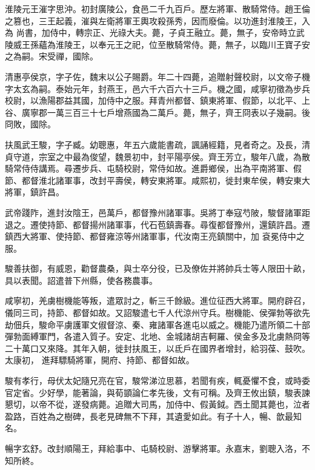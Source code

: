 \begin{pinyinscope}
 淮陵元王漼字思沖。初封廣陵公，食邑二千九百戶。歷左將軍、散騎常侍。趙王倫之篡也，三王起義，漼與左衛將軍王輿攻殺孫秀，因而廢倫。以功進封淮陵王，入為
 尚書，加侍中，轉宗正、光祿大夫。薨，子貞王融立。薨，無子，安帝時立武陵威王孫蘊為淮陵王，以奉元王之祀，位至散騎常侍。薨，無子，以臨川王寶子安之為嗣。宋受禪，國除。



 清惠亭侯京，字子佐，魏末以公子賜爵。年二十四薨，追贈射聲校尉，以文帝子機字太玄為嗣。泰始元年，封燕王，邑六千六百六十三戶。機之國，咸寧初徵為步兵校尉，以漁陽郡益其國，加侍中之服。拜青州都督、鎮東將軍、假節，以北平、上谷、廣寧郡一萬三百三十七戶增燕國為二萬戶。薨，無子，齊王冏表以子幾嗣。後冏敗，國除。



 扶風武王駿，字子臧。幼聰惠，年五六歲能書疏，諷誦經籍，見者奇之。及長，清貞守道，宗室之中最為俊望，魏景初中，封平陽亭侯。齊王芳立，駿年八歲，為散騎常侍侍講焉。尋遷步兵、屯騎校尉，常侍如故。進爵鄉侯，出為平南將軍、假節、都督淮北諸軍事，改封平壽侯，轉安東將軍。咸熙初，徙封東牟侯，轉安東大將軍，鎮許昌。



 武帝踐阼，進封汝陰王，邑萬戶，都督豫州諸軍事。吳將丁奉寇芍陂，駿督諸軍距退之。遷使持節、都督揚州諸軍事，代石苞鎮壽春。尋復都督豫州，還鎮許昌。遷鎮西大將軍、使持節、都督雍涼等州諸軍事，代汝南王亮鎮關中，加
 袞冕侍中之服。



 駿善扶御，有威恩，勸督農桑，與士卒分役，已及僚佐并將帥兵士等人限田十畝，具以表聞。詔遣普下州縣，使各務農事。



 咸寧初，羌虜樹機能等叛，遣眾討之，斬三千餘級。進位征西大將軍。開府辟召，儀同三司，持節、都督如故。又詔駿遣七千人代涼州守兵。樹機能、侯彈勃等欲先劫佃兵，駿命平虜護軍文俶督涼、秦、雍諸軍各進屯以威之。機能乃遣所領二十部彈勃面縛軍門，各遣入質子。安定、北地、金城諸胡吉軻羅、侯金多及北虜熱冏等二十萬口又來降。其年入朝，徙封扶風王，以氐戶在國界者增封，給羽葆、鼓吹。太康初，
 進拜驃騎將軍，開府、持節、都督如故。



 駿有孝行，母伏太妃隨兄亮在官，駿常涕泣思慕，若聞有疾，輒憂懼不食，或時委官定省。少好學，能著論，與荀顗論仁孝先後，文有可稱。及齊王攸出鎮，駿表諫懇切，以帝不從，遂發病薨。追贈大司馬，加侍中、假黃鉞。西土聞其薨也，泣者盈路，百姓為之樹碑，長老見碑無不下拜，其遺愛如此。有子十人，暢、歆最知名。



 暢字玄舒。改封順陽王，拜給事中、屯騎校尉、游擊將軍。永嘉末，劉聰入洛，不知所終。




\end{pinyinscope}
